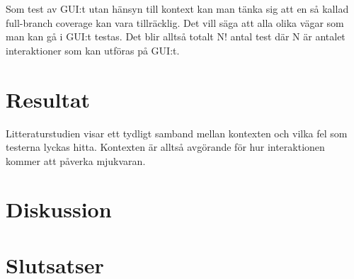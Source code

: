 Som test av GUI:t utan hänsyn till kontext kan man tänka sig att en så kallad full-branch coverage kan vara tillräcklig. Det vill säga att alla olika vägar som man kan gå i GUI:t testas. Det blir alltså totalt N! antal test där N är antalet interaktioner som kan utföras på GUI:t.

\section{Resultat}
\label{sec:results-holmberg}

Litteraturstudien visar ett tydligt samband mellan kontexten och vilka fel som testerna lyckas hitta. Kontexten är alltså avgörande för hur interaktionen kommer att påverka mjukvaran.

\section{Diskussion}
\label{sec:discussion-holmberg}


\section{Slutsatser}
\label{sec:conclusions-holmberg}


